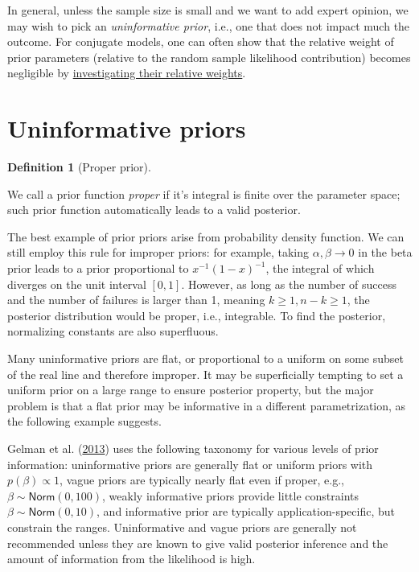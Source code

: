 \documentclass[
  11pt,
  letterpaper,
]{scrbook}
\theoremstyle{definition}
\theoremstyle{definition}
\newtheorem{definition}{Definition}[chapter]
\theoremstyle{definition}
\theoremstyle{plain}
\theoremstyle{remark}
\begin{document}
In general, unless the sample size is small and we want to add expert
opinion, we may wish to pick an \emph{uninformative prior}, i.e., one
that does not impact much the outcome. For conjugate models, one can
often show that the relative weight of prior parameters (relative to the
random sample likelihood contribution) becomes negligible by
\href{https://en.wikipedia.org/wiki/Conjugate_prior}{investigating their
relative weights}.

\hypertarget{uninformative-priors}{%
\section{Uninformative priors}\label{uninformative-priors}}

\begin{definition}[Proper
prior]\protect\hypertarget{def-properprior}{}\label{def-properprior}

We call a prior function \emph{proper} if it's integral is finite over
the parameter space; such prior function automatically leads to a valid
posterior.

\end{definition}

The best example of prior priors arise from probability density
function. We can still employ this rule for improper priors: for
example, taking \(\alpha, \beta \to 0\) in the beta prior leads to a
prior proportional to \(x^{-1}(1-x)^{-1}\), the integral of which
diverges on the unit interval \([0,1]\). However, as long as the number
of success and the number of failures is larger than 1, meaning
\(k \geq 1, n-k \geq 1\), the posterior distribution would be proper,
i.e., integrable. To find the posterior, normalizing constants are also
superfluous.

Many uninformative priors are flat, or proportional to a uniform on some
subset of the real line and therefore improper. It may be superficially
tempting to set a uniform prior on a large range to ensure posterior
property, but the major problem is that a flat prior may be informative
in a different parametrization, as the following example suggests.

Gelman et al. (\protect\hyperlink{ref-Gelman:2013}{2013}) uses the
following taxonomy for various levels of prior information:
uninformative priors are generally flat or uniform priors with
\(p(\beta) \propto 1\), vague priors are typically nearly flat even if
proper, e.g., \(\beta \sim \mathsf{Norm}(0, 100)\), weakly informative
priors provide little constraints \(\beta \sim \mathsf{Norm}(0, 10)\),
and informative prior are typically application-specific, but constrain
the ranges. Uninformative and vague priors are generally not recommended
unless they are known to give valid posterior inference and the amount
of information from the likelihood is high.
\end{document}

